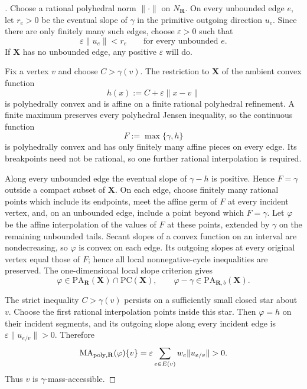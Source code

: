 
\begin{proof}[]
Choose a rational polyhedral norm $\lVert\cdot\rVert$ on $N_{\mathbf R}$.
On every unbounded edge $e$, let $r_e>0$ be the eventual slope of $\gamma$
in the primitive outgoing direction $u_e$.  Since there are only finitely
many such edges, choose $\varepsilon>0$ such that
\[
                         \varepsilon\lVert u_e\rVert<r_e
                         \qquad\text{for every unbounded }e.
\]
If $\mathbf X$ has no unbounded edge, any positive $\varepsilon$ will do.

Fix a vertex $v$ and choose $C>\gamma(v)$.  The restriction to $\mathbf X$
of the ambient convex function
\[
                         h(x):=C+\varepsilon\lVert x-v\rVert
\]
is polyhedrally convex and is affine on a finite rational polyhedral
refinement.  A finite maximum preserves every polyhedral Jensen inequality,
so the continuous function
\[
                         F:=\max\{\gamma,h\}
\]
is polyhedrally convex and has only finitely many affine pieces on every
edge.  Its breakpoints need not be rational, so one further rational
interpolation is required.

Along every unbounded edge the eventual slope of $\gamma-h$ is positive.
Hence $F=\gamma$ outside a compact subset of $\mathbf X$.  On each edge,
choose finitely many rational points which include its endpoints, meet the
affine germ of $F$ at every incident vertex, and, on an unbounded edge,
include a point beyond which $F=\gamma$.  Let $\varphi$ be the affine
interpolation of the values of $F$ at these points, extended by $\gamma$ on
the remaining unbounded tails.  Secant slopes of a convex function on an
interval are nondecreasing, so $\varphi$ is convex on each edge.  Its
outgoing slopes at every original vertex equal those of $F$; hence all local
nonnegative-cycle inequalities are preserved.  The one-dimensional local
slope criterion gives
\[
 \varphi\in\mathrm{PA}_{\mathbf R}(\mathbf X)\cap
 \mathrm{PC}(\mathbf X),
 \qquad
 \varphi-\gamma\in\mathrm{PA}_{\mathbf R,b}(\mathbf X).
\]

The strict inequality $C>\gamma(v)$ persists on a sufficiently small closed
star about $v$.  Choose the first rational interpolation points inside this
star.  Then $\varphi=h$ on their incident segments, and its outgoing slope
along every incident edge is
$\varepsilon\lVert u_{e/v}\rVert>0$.  Therefore
\[
 \operatorname{MA}_{\mathrm{poly},\mathbf R}(\varphi)\{v\}
 =\varepsilon\sum_{e\in E(v)}w_e\lVert u_{e/v}\rVert>0.
\]
Thus $v$ is $\gamma$-mass-accessible.
\end{proof}

